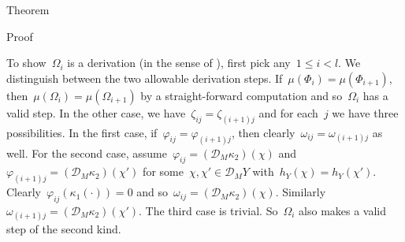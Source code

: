 \documentclass[b]{subfiles}
\begin{document}
\begin{parsec}
\begin{point}{Theorem}
\begin{point}{Proof}
\begin{point}
To show~$\Omega_i$ is
    a derivation (in the sense of ),
    first pick any~$1 \leq i < l$.
We distinguish between the two allowable derivation steps.
If~$ \mu(\Phi_i) = \mu(\Phi_{i+1}) $,
    then~$\mu(\Omega_i) = \mu(\Omega_{i+1})$
    by a straight-forward computation
    and so~$\Omega_i$ has a valid step.
In the other case, we have~$\zeta_{ij} = \zeta_{(i+1)j}$ and
    for each~$j$ we have three possibilities.
In the first case, if~$\varphi_{ij} = \varphi_{(i+1)j}$,
    then clearly~$\omega_{ij} = \omega_{(i+1)j}$ as well.
    For the second case, assume~$\varphi_{ij} = (\mathcal{D}_M \kappa_2) (\chi)$
    and~$\varphi_{(i+1)j} = (\mathcal{D}_M \kappa_2) (\chi')$
    for some~$\chi,\chi' \in \mathcal{D}_M Y$
    with~$h_Y(\chi) = h_Y(\chi')$.
    Clearly~$\varphi_{ij}(\kappa_1(\cdot)) = 0$
    and so~$\omega_{ij} = (\mathcal{D}_M \kappa_2)(\chi)$.
    Similarly~$\omega_{(i+1)j} = (\mathcal{D}_M \kappa_2)(\chi')$.
    The third case is trivial.
    So~$\Omega_i$ also makes a valid step of the second kind.


\end{point}
\end{point}
\end{point}
\end{parsec}
\end{document}
